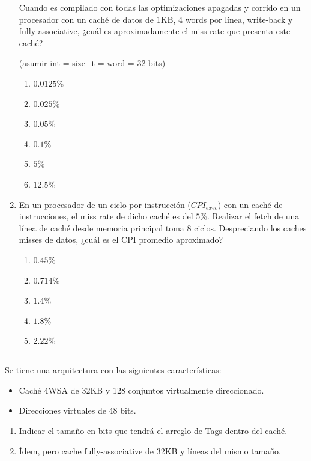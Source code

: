 \begin{enumerate}
		Cuando es compilado con todas las optimizaciones apagadas y
		corrido en un procesador con un caché de datos de 1KB, 4 words
		por línea, write-back y fully-associative, ¿cuál es
		aproximadamente el miss rate que presenta este caché?

		(asumir int = size\_t = word = 32 bits)

		\begin{enumerate}
		\item	$0.0125\%$
		\item	$0.025\%$
		\item	$0.05\%$
		\item	$0.1\%$
		\item	$5\%$
		\item	$12.5\%$
		\end{enumerate} 

\item	En un procesador de un ciclo por instrucción ($CPI_{exec}$) con
		un caché de instrucciones, el miss rate de dicho caché es del
		$5\%$. Realizar el fetch de una línea de caché desde memoria
		principal toma 8 ciclos. Despreciando los caches misses de datos,
		¿cuál es el CPI promedio aproximado?

		\begin{enumerate}
		\item	$0.45\%$
		\item	$0.714\%$
		\item	$1.4\%$
		\item	$1.8\%$
		\item	$2.22\%$
		\end{enumerate}
\end{enumerate}

    

\subsection{}
Se tiene una arquitectura con las siguientes caracterí­sticas:

\begin{itemize}
 \item Caché 4WSA de 32KB y 128 conjuntos virtualmente direccionado.
 \item Direcciones virtuales de 48 bits.
\end{itemize}
    
\begin{enumerate}
 \item Indicar el tamaño en bits que tendrá el arreglo de Tags dentro del caché.
 \item Ídem, pero cache fully-associative de 32KB y lí­neas del mismo tamaño.
\end{enumerate}

